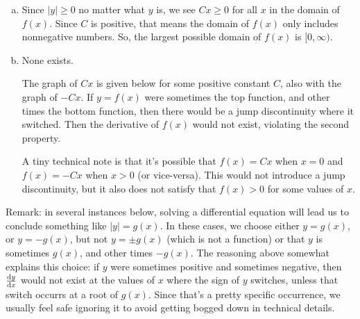 \begin{solution}
\begin{enumerate}[(a)]
\item Since $|y| \geq 0$ no matter what $y$ is, we see $Cx \ge 0$ for all $x$ in the domain of $f(x)$. Since $C$ is positive, that means the domain of $f(x)$ only includes nonnegative numbers. So, the largest possible domain of $f(x)$ is $[0,\infty)$.
\item None exists.

The graph of $Cx$ is given below for some positive constant $C$, also with the graph of $-Cx$. If $y=f(x)$ were sometimes the top function, and other times the bottom function, then there would be a jump discontinuity where it switched. Then the derivative of $f(x)$ would not exist, violating the second property.
\begin{center}\end{center}

A tiny technical note is that it's possible that $f(x)=Cx$ when $x=0$ and $f(x)=-Cx$ when $x>0$ (or vice-versa). This would not introduce a jump discontinuity, but it also does not satisfy that $f(x)>0$ for some values of $x$.
\end{enumerate}
Remark: in several instances below, solving a differential equation will lead us to conclude something like $|y|=g(x)$. In these cases, we choose either $y=g(x)$, or $y=-g(x)$, but not $y=\pm g(x)$ (which is not a function) or that $y$ is sometimes $g(x)$, and other times $-g(x)$. The reasoning above somewhat explains this choice: if $y$ were sometimes positive and sometimes negative, then $\diff{y}{x}$ would not exist at the values of $x$ where the sign of $y$ switches, unless that switch occurrs at a root of $g(x)$. Since that's a pretty specific occurrence, we usually feel safe ignoring it to avoid getting bogged down in technical details.
\end{solution}






